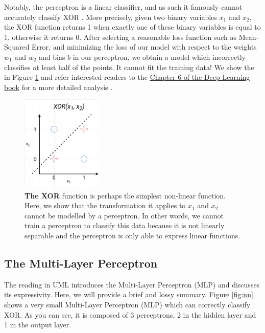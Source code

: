 \documentclass{article}
\begin{document}
\vspace{5mm} %

Notably, the perceptron is a linear classifier, and as such it famously cannot accurately classify XOR \cite{Minskyetal1969}. More precisely, given two binary variables $x_1$ and $x_2$, the XOR function returns 1 when exactly one of these binary variables is equal to 1, otherwise it returns 0. After selecting a reasonable loss function such as Mean-Squared Error, and minimizing the loss of our model with respect to the weights $w_1$ and $w_2$ and bias $b$ in our perceptron, we obtain a model which incorrectly classifies at least half of the points. It cannot fit the training data! We show the in Figure \ref{fig:XOR} and refer interested readers to the \href{https://www.deeplearningbook.org/contents/mlp.html}{Chapter 6 of the Deep Learning book} for a more detailed analysis \citep{Goodfellow-et-al-2016}.\\

\begin{figure}[H]
    \centering
    \includegraphics[width=0.35\textwidth]{figures/xor_non_linsep.png}
    \caption{\textbf{The XOR} function is perhaps the simplest non-linear function. Here, we show that the transformation it applies to $x_1$ and $x_2$ cannot be modelled by a perceptron. In other words, we cannot train a perceptron to classify this data because it is not linearly separable and the perceptron is only able to express linear functions.}
    \label{fig:XOR}
\end{figure}

\subsection{The Multi-Layer Perceptron}
The reading in UML \citep{Shalev-Shwartz:2014:UML:2621980} introduces the Multi-Layer Perceptron (MLP) and discusses its expressivity. Here, we will provide a brief and lossy summary. Figure \ref{fig:nn} shows a very small Multi-Layer Perceptron (MLP) which can correctly classify XOR. As you can see, it is composed of 3 perceptrons, 2 in the hidden layer and 1 in the output layer.
\end{document}
